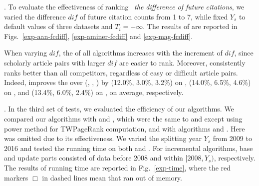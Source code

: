 .
To evaluate the effectiveness of ranking \wrt\ {\em the difference of future citations},
we varied the difference $dif$ of future citation counts from 1 to 7, while fixed $Y_s$ to default values of three datasets and $T_i=+\infty$. The results of \PairAcc are reported in Figs.~\ref{exp-aan-fcdiff}, \ref{exp-aminer-fcdiff} and \ref{exp-mag-fcdiff}.

When varying $dif$, the \PairAcc of all algorithms increases with the increment of $dif$, since scholarly article pairs with larger $dif$ are easier to rank. Moreover, \ensemblerank consistently ranks better than all competitors, regardless of easy or difficult article pairs. Indeed, \ensemblerank improves the \PairAcc over (\pagerank, \futurerank, \hhgrank) by (12.0\%, 3.0\%, 3.2\%) on \aan, (14.0\%, 6.5\%, 4.6\%) on \aminer, and (13.4\%, 6.0\%, 2.4\%) on \magdata, on average, respectively.



.
In the third set of tests, we evaluated the efficiency of our algorithms.
%
We compared our algorithms with \powtwprscc and \powensemble, which were the same to \twprscc and \batensemble except using power method for TWPageRank computation, and with algorithms \futurerank and \hhgrank.
Here \pagerank was omitted due to its effectiveness.
%
We varied the splitting year $Y_s$ from 2009 to 2016 and tested the running time on both \aminer and \magdata.
%
For incremental algorithms, base and update parts consisted of data before 2008 and within $[2008, Y_s)$, respectively.
%
The results of running time are reported in Fig.~\ref{exp-time}, where the red markers $\Box$ in dashed lines mean that \hhgrank ran out of memory.

